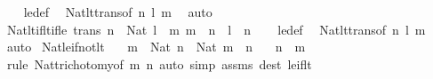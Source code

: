 \begin{isabellebody}
%
\isadelimproof
\ \ %
\endisadelimproof
%
\isatagproof
{}\isamarkupfalse%
\ le{\isacharunderscore}{\kern0pt}def\ \isamarkupfalse%
\ Nat{\isacharunderscore}{\kern0pt}lt{\isacharunderscore}{\kern0pt}trans{\isacharbrackleft}{\kern0pt}of\ n\ l\ m{\isacharbrackright}{\kern0pt}\ \isamarkupfalse%
\ auto%
\endisatagproof
{\isafoldproof}%
%
\isadelimproof
\isanewline
%
\endisadelimproof
\isanewline
{}\isamarkupfalse%
\ Nat{\isacharunderscore}{\kern0pt}lt{\isacharunderscore}{\kern0pt}if{\isacharunderscore}{\kern0pt}lt{\isacharunderscore}{\kern0pt}if{\isacharunderscore}{\kern0pt}le\ {\isacharbrackleft}{\kern0pt}trans{\isacharbrackright}{\kern0pt}{\isacharcolon}{\kern0pt}\ {\isachardoublequoteopen}{\isasymlbrakk}n\ {\isacharcolon}{\kern0pt}\ Nat{\isacharsemicolon}{\kern0pt}\ l\ {\isasymle}\ m{\isacharsemicolon}{\kern0pt}\ m\ {\isacharless}{\kern0pt}\ n{\isasymrbrakk}\ {\isasymLongrightarrow}\ l\ {\isacharless}{\kern0pt}\ n{\isachardoublequoteclose}\isanewline
%
\isadelimproof
\ \ %
\endisadelimproof
%
\isatagproof
{}\isamarkupfalse%
\ le{\isacharunderscore}{\kern0pt}def\ \isamarkupfalse%
\ Nat{\isacharunderscore}{\kern0pt}lt{\isacharunderscore}{\kern0pt}trans{\isacharbrackleft}{\kern0pt}of\ n\ l\ m{\isacharbrackright}{\kern0pt}\ \isamarkupfalse%
\ auto%
\endisatagproof
{\isafoldproof}%
%
\isadelimproof
\isanewline
%
\endisadelimproof
\isanewline
{}\isamarkupfalse%
\ Nat{\isacharunderscore}{\kern0pt}le{\isacharunderscore}{\kern0pt}if{\isacharunderscore}{\kern0pt}not{\isacharunderscore}{\kern0pt}lt{\isacharcolon}{\kern0pt}\isanewline
\ \ \ {\isachardoublequoteopen}m\ {\isacharcolon}{\kern0pt}\ Nat{\isachardoublequoteclose}\ {\isachardoublequoteopen}n\ {\isacharcolon}{\kern0pt}\ Nat{\isachardoublequoteclose}\ {\isachardoublequoteopen}{\isasymnot}{\isacharparenleft}{\kern0pt}m\ {\isacharless}{\kern0pt}\ n{\isacharparenright}{\kern0pt}{\isachardoublequoteclose}\isanewline
\ \ \ {\isachardoublequoteopen}n\ {\isasymle}\ m{\isachardoublequoteclose}\isanewline
%
\isadelimproof
\ \ %
\endisadelimproof
%
\isatagproof
{}\isamarkupfalse%
\ {\isacharparenleft}{\kern0pt}rule\ Nat{\isacharunderscore}{\kern0pt}trichotomy{\isacharbrackleft}{\kern0pt}of\ m\ n{\isacharbrackright}{\kern0pt}{\isacharparenright}{\kern0pt}\ {\isacharparenleft}{\kern0pt}auto\ simp{\isacharcolon}{\kern0pt}\ assms\ dest{\isacharcolon}{\kern0pt}\ le{\isacharunderscore}{\kern0pt}if{\isacharunderscore}{\kern0pt}lt{\isacharparenright}{\kern0pt}%

\end{isabellebody}
